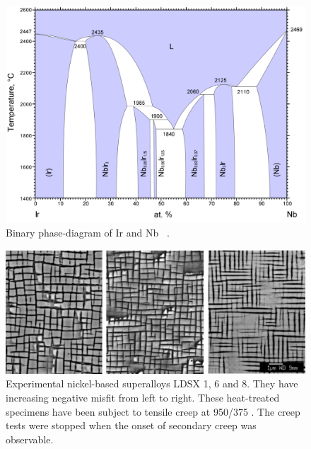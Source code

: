 \begin{figure}[H]
\begin{center}
\includegraphics[width=16cm]{irnb}
\caption{Binary phase-diagram of Ir and Nb ~\cite{okamoto94ir}.}
\label{fig:irnb}
\end{center}
\end{figure}
%
%
\begin{figure}[H]
\begin{center}
\includegraphics[width=16cm]{LDSXInterrupted}
\caption{Experimental nickel-based superalloys LDSX 1, 6 and 8.  They have increasing negative misfit from left to right.  These heat-treated specimens have been subject to tensile creep at 950\celsius/375 \mega\pascal.  The creep tests were stopped when the onset of secondary creep was observable.}
\label{fig:LDSXInterrupted}
\end{center}
\end{figure}
%
%
